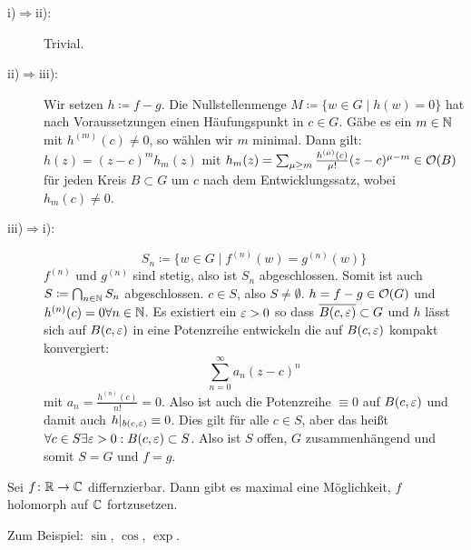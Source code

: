 \begin{beweis}
	\begin{description}
		\item[i)$ \Rightarrow $ii):] Trivial.
		\item[ii)$ \Rightarrow $iii):] Wir setzen $ h\coloneqq f-g $. Die Nullstellenmenge $ M\coloneqq\lbrace w\in G\mid h(w)=0\rbrace $ hat nach Voraussetzungen einen H\"aufungspunkt in $ c\in G $. G\"abe es ein $ m\in\mathbb{N} $ mit $ h^{(m)}(c)\neq 0 $, so w\"ahlen wir $ m $ minimal. Dann gilt: $ h(z)=(z-c)^m h_m(z) $ mit $ h_m(z)=\sum_{\mu\geq m}^{}\frac{h^{(\mu)}(c)}{\mu!}(z-c)^{\mu-m}\in\mathcal O(B) $ f\"ur jeden Kreis $ B\subset G $ um $ c $ nach dem Entwicklungssatz, wobei $ h_m(c)\neq 0 $. 
		\item[iii)$ \Rightarrow $i):] \[ S_n\coloneqq\lbrace w\in G\mid f^{(n)}(w)=g^{(n)}(w)\rbrace \]
		$ f^{(n)} $ und $ g^{(n)} $ sind stetig, also ist $ S_n $ abgeschlossen. Somit ist auch $ S\coloneqq\bigcap_{n\in\mathbb{N}}S_n $ abgeschlossen. $ c\in S $, also $ S\neq\emptyset $. $ h=f-g\in\mathcal O(G) $ und $ h^{(n)}(c)=0\forall n\in\mathbb{N} $. Es existiert ein $ \varepsilon>0 $ so dass $ \overline{B(c,\varepsilon)}\subset G $ und $ h $ l\"asst sich auf $ B(c,\varepsilon) $ in eine Potenzreihe entwickeln die auf $ B(c,\varepsilon) $ kompakt konvergiert:
		\[ \sum_{n=0}^{\infty}a_n(z-c)^n \]
		mit $ a_n=\frac{h^{(n)}(c)}{n!}=0 $. Also ist auch die Potenzreihe $ \equiv 0 $ auf $ B(c,\varepsilon) $ und damit auch $ h|_{b(c,\varepsilon)}\equiv 0 $. Dies gilt f\"ur alle $ c\in S $, aber das hei\ss t $ \forall c\in S\exists \varepsilon>0: B(c,\varepsilon)\subset S $. Also ist $ S $ offen, $ G $ zusammenh\"angend und somit $ S=G $ und $ f=g $.
	\end{description}
\end{beweis}
\begin{korollar}
	Sei $ f\colon\mathbb{R}\rightarrow\mathbb{C} $ differnzierbar. Dann gibt es maximal eine M\"oglichkeit, $ f $ holomorph auf $ \mathbb{C} $ fortzusetzen.
\end{korollar}
Zum Beispiel: $ \sin $, $ \cos $, $ \exp $.
